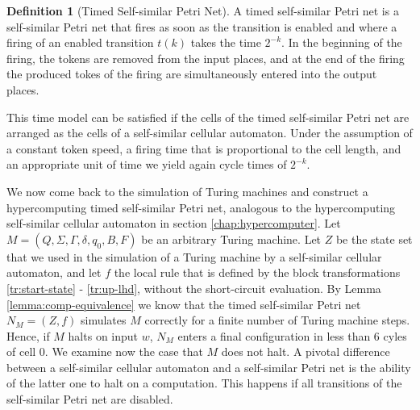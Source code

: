\documentclass[pre,showpacs,showkeys,preprint]{revtex4}
\theoremstyle{definition}
\newtheorem{defn}{Definition}
\begin{document}
\begin{defn}[Timed Self-similar Petri Net]
A timed self-similar Petri net is a self-similar Petri net that fires as soon as the transition is enabled and where a firing of an enabled transition $t(k)$ takes the time $2^{-k}$.
In the beginning of the firing, the tokens are removed from the input places, and at the end of the firing
the produced tokes of the firing are simultaneously entered into the output places.
\end{defn}

This time model can be satisfied if the cells of the timed self-similar Petri net  are arranged as the cells of a self-similar cellular automaton.
Under the assumption of a constant token speed, a firing time that is  proportional to the cell length,
and an appropriate unit of time
we yield  again cycle times of $2^{-k}$.

We now come back to the simulation of Turing machines and construct a hypercomputing timed self-similar Petri net, analogous to the
hypercomputing self-similar cellular automaton in section \ref{chap:hypercomputer}.
Let $M = (Q, \Sigma, \Gamma, \delta, q_0, B, F)$ be an arbitrary Turing machine.
Let $Z$ be the state set that we used in the simulation of a Turing machine by a self-similar cellular automaton, and let
$f$ the local rule that is defined by the block transformations \ref{tr:start-state} - \ref{tr:up-lhd},
without the short-circuit evaluation.
By Lemma \ref{lemma:comp-equivalence} we know that the timed self-similar Petri net $N_M = (Z, f)$ simulates $M$ correctly for a finite number of Turing machine steps.
Hence, if $M$ halts on input $w$, $N_M$ enters a final configuration in less than 6 cyles of cell 0.
We examine now the case that $M$ does not halt.
A pivotal difference between a self-similar cellular automaton and a self-similar Petri net is the ability of the latter one to halt on a computation.
This happens if all transitions of the self-similar Petri net are disabled.
\end{document}
